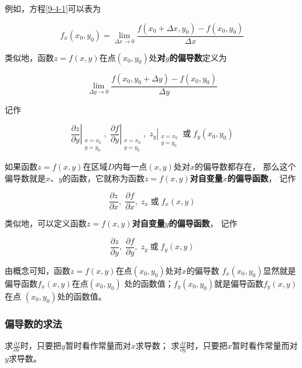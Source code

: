 \documentclass[12pt, a4paper]{article}
\numberwithin{equation}{section}
\newcommand{\pderiv}[2]{\frac{\partial #1}{\partial #2}}
\begin{document}
    例如，方程\ref{9-4-1}可以表为

    \begin{equation}
        f_x\left(x_0, y_0\right)=\lim _{\Delta x \rightarrow 0} \frac{f\left(x_0+\Delta x, y_0\right)-f\left(x_0, y_0\right)}{\Delta x}
    \end{equation}

    类似地，函数\(z=f\left(x,y\right)\)在点\(\left(x_0,y_0\right)\)处\textbf{对\(y\)的偏导数}定义为

    \begin{equation}
        \lim _{\Delta y \rightarrow 0} \frac{f\left(x_0, y_0+\Delta y\right)-f\left(x_0, y_0\right)}{\Delta y}
    \end{equation}

    记作

    $$
        \left.\frac{\partial z}{\partial y}\right|_{\substack{x=x_0 \\ y=y_0}},\;
        \left.\frac{\partial f}{\partial y}\right|_{\substack{x=x_0 \\ y=y_0}},\;
        \left.z_y\right|_{\substack{x=x_0 \\ y=y_0}}\; \text{或}\;
        f_y\left(x_0, y_0\right)
    $$

    如果函数\(z=f\left(x,y\right)\)在区域\(D\)内每一点\(\left(x,y\right)\)处对\(x\)的偏导数都存在，
    那么这个偏导数就是\(x\)、\(y\)的函数，它就称为函数\(z=f\left(x,y\right)\)\textbf{对自变量\(x\)的偏导函数}，
    记作

    $$
        \pderiv{z}{x},\;
        \pderiv{f}{x},\;
        z_x\; \text{或}\;
        f_x\left(x, y\right)
    $$

    类似地，可以定义函数\(z=f\left(x,y\right)\)\textbf{对自变量\(y\)的偏导函数}，
    记作

    $$
        \pderiv{z}{y},\;
        \pderiv{f}{y},\;
        z_y\; \text{或}\;
        f_y\left(x, y\right)
    $$

    由概念可知，函数\(z=f\left(x,y\right)\)在点\(\left(x_0,y_0\right)\)处对\(x\)的偏导数
    \(f_x\left(x_0, y_0\right)\)显然就是偏导函数\(f_x\left(x, y\right)\)在点\(\left(x_0,y_0\right)\)
    处的函数值；\(f_y\left(x_0, y_0\right)\)就是偏导函数\(f_y\left(x, y\right)\)在点
    \(\left(x_0,y_0\right)\)处的函数值。

\subsubsection{偏导数的求法}

    求\(\pderiv{f}{x}\)时，只要把\(y\)暂时看作常量而对\(x\)求导数；
    求\(\pderiv{f}{y}\)时，只要把\(x\)暂时看作常量而对\(y\)求导数。
\end{document}
